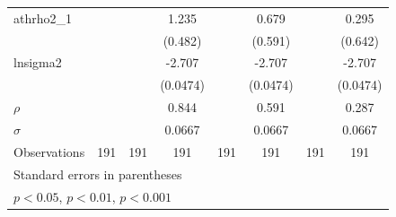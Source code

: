 {\begin{tabular}{l*{7}{c}}
athrho2\_1           &                     &                     &       1.235\sym{*}  &                     &       0.679         &                     &       0.295         \\
                    &                     &                     &     (0.482)         &                     &     (0.591)         &                     &     (0.642)         \\
\addlinespace
lnsigma2            &                     &                     &      -2.707\sym{***}&                     &      -2.707\sym{***}&                     &      -2.707\sym{***}\\
                    &                     &                     &    (0.0474)         &                     &    (0.0474)         &                     &    (0.0474)         \\
\midrule
\(\rho\)            &                     &                     &       0.844         &                     &       0.591         &                     &       0.287         \\
\(\sigma\)          &                     &                     &      0.0667         &                     &      0.0667         &                     &      0.0667         \\
Observations        &         191         &         191         &         191         &         191         &         191         &         191         &         191         \\
\bottomrule
\multicolumn{8}{l}{\footnotesize Standard errors in parentheses}\\
\multicolumn{8}{l}{\footnotesize \sym{*} \(p<0.05\), \sym{**} \(p<0.01\), \sym{***} \(p<0.001\)}\\
\end{tabular}
}
